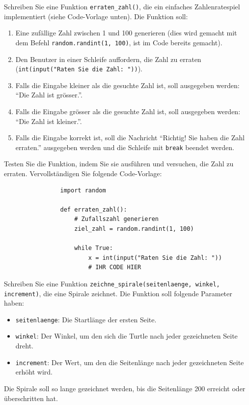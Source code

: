 \begin{myexercise}
	Schreiben Sie eine Funktion \lstinline|erraten_zahl()|, die ein einfaches Zahlenratespiel implementiert (siehe Code-Vorlage unten). Die Funktion soll:
	\begin{enumerate}
		\item Eine zufällige Zahl zwischen 1 und 100 generieren (dies wird gemacht mit dem Befehl \lstinline|random.randint(1, 100)|, ist im Code bereits gemacht).
		\item Den Benutzer in einer Schleife auffordern, die Zahl zu erraten (\lstinline|int(input("Raten Sie die Zahl: "))|).
		\item Falls die Eingabe kleiner als die gesuchte Zahl ist, soll ausgegeben werden: \enquote{Die Zahl ist grösser.}.
		\item Falls die Eingabe grösser als die gesuchte Zahl ist, soll ausgegeben werden: \enquote{Die Zahl ist kleiner.}.
		\item Falls die Eingabe korrekt ist, soll die Nachricht \enquote{Richtig! Sie haben die Zahl erraten.} ausgegeben werden und die Schleife mit \lstinline|break| beendet werden.
	\end{enumerate}
	Testen Sie die Funktion, indem Sie sie ausführen und versuchen, die Zahl zu erraten.
	Vervollständigen Sie folgende Code-Vorlage:
	\begin{lstlisting}
				import random

				def erraten_zahl():
					# Zufallszahl generieren
					ziel_zahl = random.randint(1, 100)

					while True:
						x = int(input("Raten Sie die Zahl: "))
						# IHR CODE HIER
		\end{lstlisting}
	\begin{myanswer}
		
	\end{myanswer}
\end{myexercise}

\begin{myexercise}
	Schreiben Sie eine Funktion \lstinline|zeichne_spirale(seitenlaenge, winkel, increment)|, die eine Spirale zeichnet. Die Funktion soll folgende Parameter haben:
	\begin{itemize}
		\item \lstinline|seitenlaenge|: Die Startlänge der ersten Seite.
		\item \lstinline|winkel|: Der Winkel, um den sich die Turtle nach jeder gezeichneten Seite dreht.
		\item \lstinline|increment|: Der Wert, um den die Seitenlänge nach jeder gezeichneten Seite erhöht wird.
	\end{itemize}
	Die Spirale soll so lange gezeichnet werden, bis die Seitenlänge 200 erreicht oder überschritten hat.

	\begin{myanswer}
		
	\end{myanswer}
\end{myexercise}

